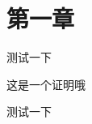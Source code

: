 \chapter{第一章}

\begin{exercise}
  测试一下
\end{exercise}

\begin{answer}
  这是一个证明哦
\end{answer}

\begin{exercise}[title = 泛函分析P22]
  测试一下
\end{exercise}
